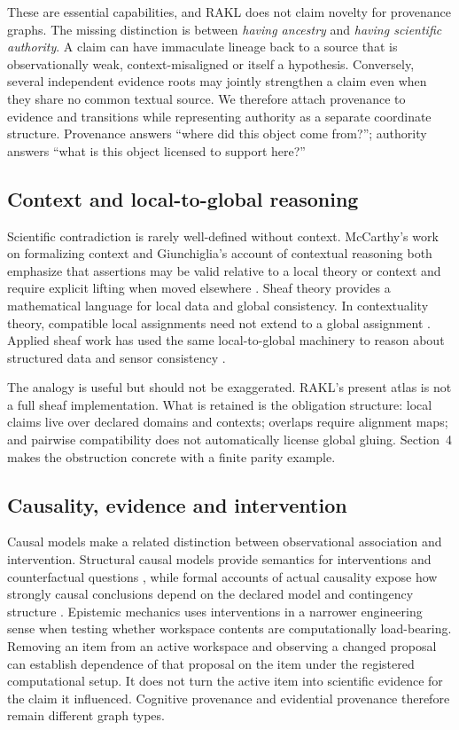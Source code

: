 These are essential capabilities, and RAKL does not claim novelty for provenance graphs. The missing distinction is between \emph{having ancestry} and \emph{having scientific authority}. A claim can have immaculate lineage back to a source that is observationally weak, context-misaligned or itself a hypothesis. Conversely, several independent evidence roots may jointly strengthen a claim even when they share no common textual source. We therefore attach provenance to evidence and transitions while representing authority as a separate coordinate structure. Provenance answers ``where did this object come from?''; authority answers ``what is this object licensed to support here?''

\subsection{Context and local-to-global reasoning}

Scientific contradiction is rarely well-defined without context. McCarthy's work on formalizing context and Giunchiglia's account of contextual reasoning both emphasize that assertions may be valid relative to a local theory or context and require explicit lifting when moved elsewhere \cite{mccarthy1993,giunchiglia1993}. Sheaf theory provides a mathematical language for local data and global consistency. In contextuality theory, compatible local assignments need not extend to a global assignment \cite{abramsky2011}. Applied sheaf work has used the same local-to-global machinery to reason about structured data and sensor consistency \cite{curry2014,robinson2017}.

The analogy is useful but should not be exaggerated. RAKL's present atlas is not a full sheaf implementation. What is retained is the obligation structure: local claims live over declared domains and contexts; overlaps require alignment maps; and pairwise compatibility does not automatically license global gluing. Section~4 makes the obstruction concrete with a finite parity example.

\subsection{Causality, evidence and intervention}

Causal models make a related distinction between observational association and intervention. Structural causal models provide semantics for interventions and counterfactual questions \cite{pearl2009}, while formal accounts of actual causality expose how strongly causal conclusions depend on the declared model and contingency structure \cite{halpern2016}. Epistemic mechanics uses interventions in a narrower engineering sense when testing whether workspace contents are computationally load-bearing. Removing an item from an active workspace and observing a changed proposal can establish dependence of that proposal on the item under the registered computational setup. It does not turn the active item into scientific evidence for the claim it influenced. Cognitive provenance and evidential provenance therefore remain different graph types.

